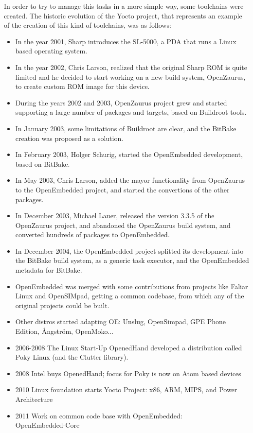 \documentclass[a4paper,11pt,openany]{report}
\begin{document}
In order to try to manage this tasks in a more simple way, some toolchains were created. The historic evolution of the Yocto project, that represents an example of the creation of this kind of toolchains, was as follows:

\begin{itemize}
\item In the year 2001, Sharp introduces the SL-5000, a PDA that runs a Linux based operating system.
\item In the year 2002, Chris Larson, realized that the original Sharp ROM is quite limited and he decided to start working on a new build system, OpenZaurus\cite{openzaurus}, to create custom ROM image for this device.
\item During the years 2002 and 2003, OpenZaurus project grew and started supporting a large number of packages and targets, based on Buildroot tools\cite{buildroot}.
\item In January 2003, some limitations of Buildroot are clear, and the BitBake\cite{bitbake} creation was proposed as a solution.
\item In February 2003, Holger Schurig, started the OpenEmbedded development, based on BitBake.
\item In May 2003, Chris Larson, added the mayor functionality from OpenZaurus to the OpenEmbedded project, and started the convertions of the other packages.
\item In December 2003, Michael Lauer, released the version 3.3.5 of the OpenZaurus project, and abandoned the OpenZaurus build system, and converted hundreds of packages to OpenEmbedded.
\item In December 2004, the OpenEmbedded project splitted its development into the BitBake build system, as a generic task executor, and the OpenEmbedded metadata for BitBake.
\item OpenEmbedded was merged with some contributions from projects like Faliar Linux and OpenSIMpad, getting a common codebase, from which any of the original projects could be built.
\item Other distros started adapting OE: Unslug, OpenSimpad, GPE Phone Edition, {\AA}ngstr\"om, OpenMoko... 
\item 2006-2008 The Linux Start-Up OpenedHand developed a distribution called Poky Linux\cite{poky} (and the Clutter library).
\item 2008 Intel buys OpenedHand; focus for Poky is now on Atom based devices
\item 2010 Linux foundation starts Yocto Project: x86, ARM, MIPS, and Power Architecture
\item 2011 Work on common code base with OpenEmbedded:\\OpenEmbedded-Core 
\end{itemize}
\end{document}
